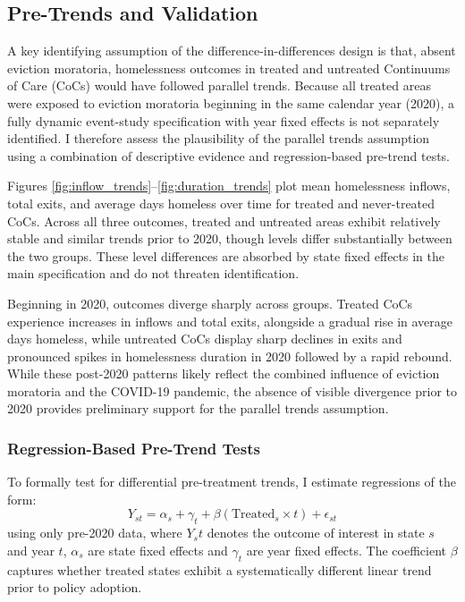 \documentclass[12pt]{article}
\begin{document}
\subsection{Pre-Trends and Validation}

A key identifying assumption of the difference-in-differences design is that, absent eviction
moratoria, homelessness outcomes in treated and untreated Continuums of Care (CoCs) would
have followed parallel trends. Because all treated areas were exposed to eviction moratoria
beginning in the same calendar year (2020), a fully dynamic event-study specification with year
fixed effects is not separately identified. I therefore assess the plausibility of the parallel trends
assumption using a combination of descriptive evidence and regression-based pre-trend tests.

Figures \ref{fig:inflow_trends}–\ref{fig:duration_trends} plot mean homelessness inflows, total exits, and average days homeless over time for treated and never-treated CoCs. Across all three outcomes, treated and untreated areas exhibit relatively stable and similar trends prior to 2020, though levels differ substantially between the two groups. These level differences are absorbed by state fixed effects in the main specification and do not threaten identification.

Beginning in 2020, outcomes diverge sharply across groups. Treated CoCs experience increases
in inflows and total exits, alongside a gradual rise in average days homeless, while untreated
CoCs display sharp declines in exits and pronounced spikes in homelessness duration in 2020
followed by a rapid rebound. While these post-2020 patterns likely reflect the combined influence
of eviction moratoria and the COVID-19 pandemic, the absence of visible divergence prior to 2020
provides preliminary support for the parallel trends assumption.

\subsubsection{Regression-Based Pre-Trend Tests}

To formally test for differential pre-treatment trends, I estimate regressions of the form:
\begin{equation}
Y_{st} = \alpha_s + \gamma_t + \beta(\text{Treated}_s \times t) + \epsilon_{st}
\end{equation}
using only pre-2020 data, where $Y_st$ denotes the outcome of interest in state $s$ and year $t$, $\alpha_s$ are state fixed effects and $\gamma_t$ are year fixed effects. The coefficient $\beta$ captures whether treated states exhibit a systematically different linear trend prior to policy adoption. 
\end{document}
